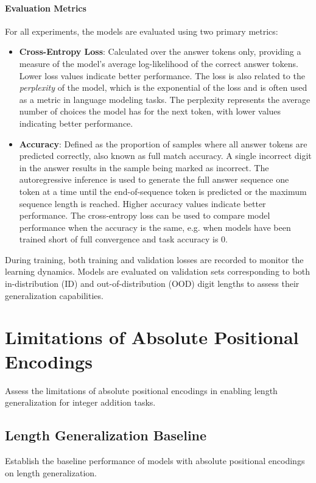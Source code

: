 \paragraph{Evaluation Metrics}

For all experiments, the models are evaluated using two primary metrics:

\begin{itemize}
    \item \textbf{Cross-Entropy Loss}: Calculated over the answer tokens only, providing a measure of the model's average log-likelihood of the correct answer tokens. Lower loss values indicate better performance. The loss is also related to the \emph{perplexity} of the model, which is the exponential of the loss and is often used as a metric in language modeling tasks. The perplexity represents the average number of choices the model has for the next token, with lower values indicating better performance.
    \item \textbf{Accuracy}: Defined as the proportion of samples where all answer tokens are predicted correctly, also known as full match accuracy. A single incorrect digit in the answer results in the sample being marked as incorrect. The autoregressive inference is used to generate the full answer sequence one token at a time until the end-of-sequence token is predicted or the maximum sequence length is reached. Higher accuracy values indicate better performance. The cross-entropy loss can be used to compare model performance when the accuracy is the same, e.g. when models have been trained short of full convergence and task accuracy is 0.
\end{itemize}

During training, both training and validation losses are recorded to monitor the learning dynamics. Models are evaluated on validation sets corresponding to both in-distribution (ID) and out-of-distribution (OOD) digit lengths to assess their generalization capabilities.


\section{Limitations of Absolute Positional Encodings}\label{sec:absolute_positional_limitations}
Assess the limitations of absolute positional encodings in enabling length generalization for integer addition tasks.


\subsection{Length Generalization Baseline}
Establish the baseline performance of models with absolute positional encodings on length generalization.

